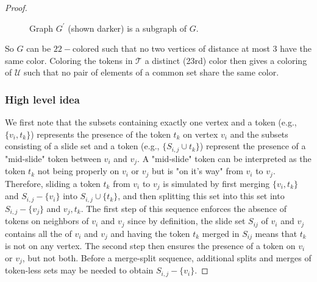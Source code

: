 \begin{proof}
\begin{figure} [H]
  \caption{Graph $G^{'}$ (shown darker) is a subgraph of $G$.}
  \label{fig:subgraph}
\end{figure}


So $G$ can be $22-$colored such that no two vertices of distance at most $3$ have the same color. Coloring the tokens in $\mathcal{T}$
a distinct (23rd) color then gives a coloring of $\mathcal{U}$ such that no pair of elements of a common set share the same color.

\subsubsection{High level idea}\label{subsubsection:high_level}
We first note that the subsets containing exactly one vertex and a token (e.g., $\{v_i, t_k\}$) represents the presence of the token
$t_k$ on vertex $v_i$ and the subsets consisting of a slide set and a token (e.g., $\{S_{i,j} \cup t_k\}$) represent the presence of a
"mid-slide" token between $v_i$ and $v_j$. A "mid-slide" token can be interpreted as the token $t_k$ not being properly on $v_i$ or $v_j$ but is
"on it's way" from $v_i$ to $v_j$. Therefore, sliding a token $t_k$ from $v_i$ to $v_j$ is simulated by first
merging $\{v_i, t_k\}$ and $S_{i,j}-\{v_i\}$ into $S_{i,j} \cup \{t_k\}$, and then splitting this set into this set into $S_{i,j}-\{v_j\}$
and ${v_j, t_k}$. The first step of this sequence enforces the absence of tokens on neighbors of $v_i$ and $v_j$ since by definition, the slide
set $S_{ij}$ of $v_i$ and $v_j$ contains all the of $v_i$ and $v_j$ and having the token $t_k$  merged in $S_{ij}$ means that $t_k$ is not on any
vertex. The second step then ensures the presence of a token on $v_i$ or $v_j$, but not both.
Before a merge-split sequence, additional splits and merges of token-less sets may be needed to obtain $S_{i,j}-\{v_i\}$.


\end{proof}
